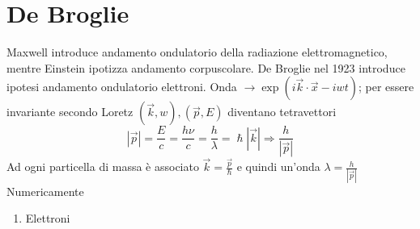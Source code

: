 \documentclass[a4paper,11pt]{report}
\theoremstyle{remark}
\theoremstyle{definition}
\begin{document}
\chapter{De Broglie}
Maxwell introduce andamento ondulatorio della radiazione elettromagnetico, mentre Einstein ipotizza andamento corpuscolare. De Broglie nel 1923 introduce ipotesi andamento ondulatorio elettroni. \newline
Onda $\rightarrow \exp(i \vec{k}\cdot \vec{x}- iwt)$; per essere invariante secondo Loretz $(\vec{k},w),(\vec{p},E)$ diventano tetravettori
\begin{equation*}
    |\vec{p}| = \frac{E}{c} = \frac{h\nu}{c} = \frac{h}{\lambda} = \hslash |\vec{k}| \Rightarrow \frac{h}{|\vec{p}|}
\end{equation*}
Ad ogni particella di massa è associato $\vec{k} = \frac{\vec{p}}{\hslash}$ e quindi un'onda $\lambda = \frac{h}{|\vec{p}|}$ \newline
Numericamente
\begin{enumerate}
    \item Elettroni
\end{enumerate} 
\end{document}
